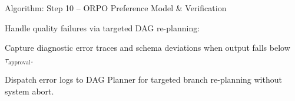 \documentclass[aspectratio=169,10pt]{beamer}
\newenvironment{algolist}{%
  \begin{list}{}{%
    \setlength{\labelwidth}{1.9em}%
    \setlength{\leftmargin}{2.1em}%
    \setlength{\itemindent}{0pt}%
    \setlength{\labelsep}{0.45em}%
    \setlength{\itemsep}{0.28em}%
    \setlength{\parsep}{0pt}%
    \setlength{\topsep}{0.1em}%
    \renewcommand{\makelabel}[1]{\textbf{\color{lavenderDark}##1}}%
  }\small%
}{\end{list}}
\newenvironment{algosublist}{%
  \begin{list}{}{%
    \setlength{\labelwidth}{2.4em}%
    \setlength{\leftmargin}{2.8em}%
    \setlength{\itemindent}{0pt}%
    \setlength{\labelsep}{0.4em}%
    \setlength{\itemsep}{0.14em}%
    \setlength{\parsep}{0pt}%
    \setlength{\topsep}{0.1em}%
    \renewcommand{\makelabel}[1]{\textbf{\color{lavenderMedium}##1}}%
  }\small%
}{\end{list}}
\begin{document}
\begin{frame}[t]{Algorithm: Step 10 -- ORPO Preference Model \& Verification}
\begin{algolist}
\begin{algosublist}
    \end{algosublist}
  \item[10.3] Handle quality failures via targeted DAG re-planning:
    \begin{algosublist}
      \item[10.3.1] Capture diagnostic error traces and schema deviations when output falls below $\tau_{\mathrm{approval}}$.
      \item[10.3.2] Dispatch error logs to DAG Planner for targeted branch re-planning without system abort.
    \end{algosublist}
\end{algolist}
\end{frame}

\end{document}
